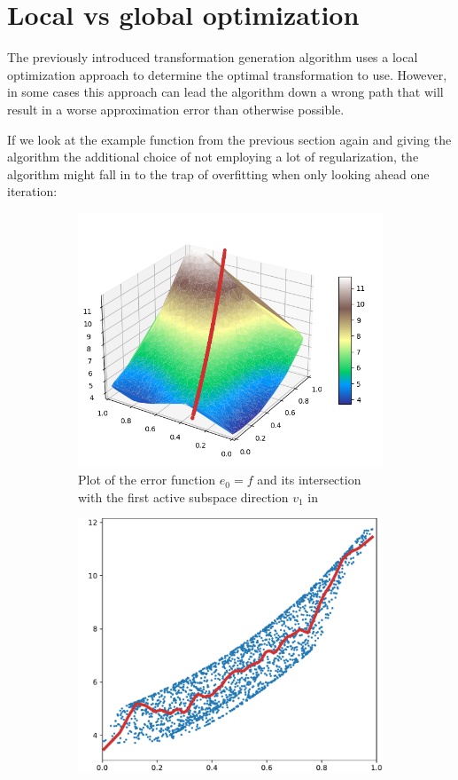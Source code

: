 \documentclass[
  a4paper,  %
  twoside,  %
  bibliography=totoc,
  headsepline,
  cleardoublepage=empty,
  parskip=half,
  draft=false
]{scrbook}
\begin{document}
\section{Local vs global optimization}

The previously introduced transformation generation algorithm uses a local optimization approach to determine the optimal transformation to use.
However, in some cases this approach can lead the algorithm down a wrong path that will result in a worse approximation error than otherwise possible.

If we look at the example function from the previous section again and giving the algorithm the additional choice of not employing a lot of regularization, the algorithm might fall in to the trap of overfitting when only looking ahead one iteration:
\begin{mdframed}[style=style]
\begin{figure}[H]
\begin{subfigure}{.5\textwidth}
  \centering
  \includegraphics[width=.85\linewidth]{graphics/pipeline_bad_current_1.png}
  \caption{Plot of the error function $e_0=f$ and its intersection with the first active subspace direction $v_1$ in \reddot}
\label{fig:pipeline_bad_current_1}
\end{subfigure}%
\begin{subfigure}{.5\textwidth}
  \centering
  \includegraphics[width=.85\linewidth]{graphics/pipeline_bad_local_1}

\end{subfigure}
\end{figure}
\end{mdframed}
\end{document}
